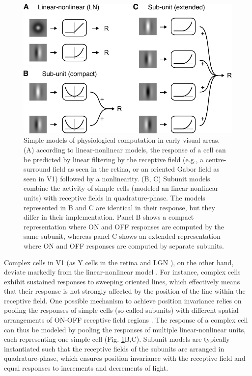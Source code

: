 \begin{figure}
  \centering
  \includegraphics{early-models}
  \caption[Models of physiological computation in early visual areas.]{Simple models of physiological computation in early visual areas. (A) according to linear-nonlinear models, the response of a cell can be predicted by linear filtering by the receptive field (e.g., a centre-surround field as seen in the retina, or an oriented Gabor field as seen in V1) followed by a nonlinearity. (B, C) Subunit models combine the activity of simple cells (modeled an linear-nonlinear units) with receptive fields in quadrature-phase. The models represented in B and C are identical in their response, but they differ in their implementation. Panel B shows a compact representation where ON and OFF responses are computed by the same subunit, whereas panel C shows an extended representation where ON and OFF responses are computed by separate subunits.}
  \label{fig:earlymodels}
\end{figure}

Complex cells in V1 (as Y cells in the retina \cite{Enroth-Cugell:1966zr,Hochstein:1976ly} and LGN \cite{Shapley:1975aa}), on the other hand, deviate markedly from the linear-nonlinear model \cite{Movshon:1978bh}. For instance, complex cells exhibit sustained responses to sweeping oriented lines, which effectively means that their response is not strongly affected by the position of the line within the receptive field. One possible mechanism to achieve position invariance relies on pooling the responses of simple cells (so-called subunits) with different spatial arrangements of ON-OFF receptive field regions \cite{HUBEL:1962ti,Hochstein:1976ly,Movshon:1978bh}. The response of a complex cell can thus be modeled by pooling the responses of multiple linear-nonlinear units, each representing one simple cell (Fig. \ref{fig:earlymodels}B,C). Subunit models are typically instantiated such that the receptive fields of the subunits are arranged in quadrature-phase, which ensures position invariance with the receptive field and equal responses to increments and decrements of light.

